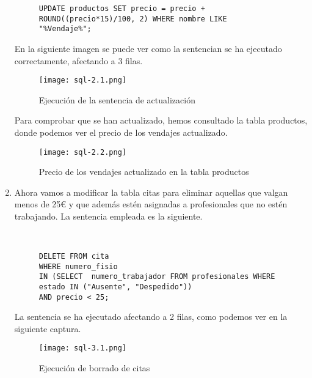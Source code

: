 \begin{enumerate}
\begin{figure}[H]
\begin{tcolorbox}[sharp corners, colback=yellow!30, colframe=white!20]
\begin{verbatim}
UPDATE productos SET precio = precio + ROUND((precio*15)/100, 2) WHERE nombre LIKE "%Vendaje%";
            \end{verbatim}
        \end{tcolorbox}
    \end{figure}

    En la siguiente imagen se puede ver como la sentencian se ha ejecutado correctamente, afectando a 3 filas.

    \begin{figure}[H]
        \centering
        \texttt{[image: sql-2.1.png]}
        \caption{Ejecución de la sentencia de actualización}
    \end{figure}

    Para comprobar que se han actualizado, hemos consultado la tabla productos, donde podemos ver el precio de los vendajes actualizado.

     \begin{figure}[H]
        \centering
        \texttt{[image: sql-2.2.png]}
        \caption{Precio de los vendajes actualizado en la tabla productos}
    \end{figure}

    \item Ahora vamos a modificar la tabla citas para eliminar aquellas que valgan menos de 25€ y que además estén asignadas a profesionales que no estén trabajando. La sentencia empleada es la siguiente.


    \begin{figure}[H]
        \begin{tcolorbox}[sharp corners, colback=yellow!30, colframe=white!20]
            \scriptsize
            \begin{verbatim}


DELETE FROM cita
WHERE numero_fisio
IN (SELECT  numero_trabajador FROM profesionales WHERE estado IN ("Ausente", "Despedido"))
AND precio < 25;
            \end{verbatim}
        \end{tcolorbox}
    \end{figure}

    La sentencia se ha ejecutado afectando a 2 filas, como podemos ver en la siguiente captura.

    \begin{figure}[H]
        \centering
        \texttt{[image: sql-3.1.png]}
        \caption{Ejecución de borrado de citas}
    \end{figure}


\end{enumerate}
